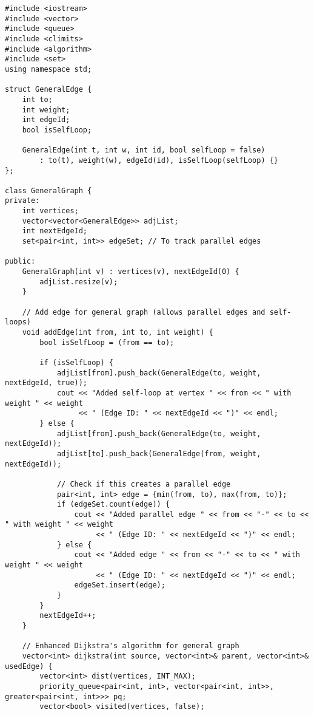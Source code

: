 \documentclass[12pt,a4paper]{article}
\begin{document}
\begin{lstlisting}[caption={Thuật toán Dijkstra cho đồ thị tổng quát}]
#include <iostream>
#include <vector>
#include <queue>
#include <climits>
#include <algorithm>
#include <set>
using namespace std;

struct GeneralEdge {
    int to;
    int weight;
    int edgeId;
    bool isSelfLoop;
    
    GeneralEdge(int t, int w, int id, bool selfLoop = false) 
        : to(t), weight(w), edgeId(id), isSelfLoop(selfLoop) {}
};

class GeneralGraph {
private:
    int vertices;
    vector<vector<GeneralEdge>> adjList;
    int nextEdgeId;
    set<pair<int, int>> edgeSet; // To track parallel edges
    
public:
    GeneralGraph(int v) : vertices(v), nextEdgeId(0) {
        adjList.resize(v);
    }
    
    // Add edge for general graph (allows parallel edges and self-loops)
    void addEdge(int from, int to, int weight) {
        bool isSelfLoop = (from == to);
        
        if (isSelfLoop) {
            adjList[from].push_back(GeneralEdge(to, weight, nextEdgeId, true));
            cout << "Added self-loop at vertex " << from << " with weight " << weight 
                 << " (Edge ID: " << nextEdgeId << ")" << endl;
        } else {
            adjList[from].push_back(GeneralEdge(to, weight, nextEdgeId));
            adjList[to].push_back(GeneralEdge(from, weight, nextEdgeId));
            
            // Check if this creates a parallel edge
            pair<int, int> edge = {min(from, to), max(from, to)};
            if (edgeSet.count(edge)) {
                cout << "Added parallel edge " << from << "-" << to << " with weight " << weight 
                     << " (Edge ID: " << nextEdgeId << ")" << endl;
            } else {
                cout << "Added edge " << from << "-" << to << " with weight " << weight 
                     << " (Edge ID: " << nextEdgeId << ")" << endl;
                edgeSet.insert(edge);
            }
        }
        nextEdgeId++;
    }
    
    // Enhanced Dijkstra's algorithm for general graph
    vector<int> dijkstra(int source, vector<int>& parent, vector<int>& usedEdge) {
        vector<int> dist(vertices, INT_MAX);
        priority_queue<pair<int, int>, vector<pair<int, int>>, greater<pair<int, int>>> pq;
        vector<bool> visited(vertices, false);
        

\end{lstlisting}
\end{document}
